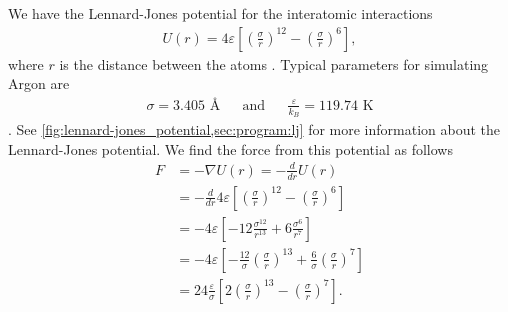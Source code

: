 We have the Lennard-Jones potential for the interatomic interactions
\begin{align}%
    U(r) = 4\varepsilon \left[ \left(\frac{\sigma}{r}\right)^{12} - \left(\frac{\sigma}{r}\right)^6 \right], \label{eq:LJ}%
\end{align}%
where $r$ is the distance between the atoms%
. Typical parameters for simulating Argon are
\begin{align*}%
    &\sigma = 3.405 \text{ \AA}& &\text{and}& &\frac{\varepsilon}{k_B} = 119.74 \text{ K}&%
\end{align*}%
. See \cref{fig:lennard-jones_potential,sec:program:lj} for more information about the Lennard-Jones potential. We find the force from this potential as follows
\begin{align*}%
    F &= -\nabla U(r) = - \frac{d}{dr}U(r) \\%
    &= -\frac{d}{dr} 4\varepsilon \left[\left(\frac{\sigma}{r}\right)^{12} - \left(\frac{\sigma}{r}\right)^6 \right] \\%
    &= -4\varepsilon \left[-12 \frac{\sigma^{12}}{r^{13}} + 6 \frac{\sigma^6}{r^7} \right] \\%
    &= -4 \varepsilon \left[ -\frac{12}{\sigma}\left(\frac{\sigma}{r}\right)^{13} + \frac{6}{\sigma}\left(\frac{\sigma}{r}\right)^7 \right] \\%
    &= 24 \frac{\varepsilon}{\sigma} \left[ 2\left(\frac{\sigma}{r}\right)^{13} - \left(\frac{\sigma}{r}\right)^7 \right].%
\end{align*}%


